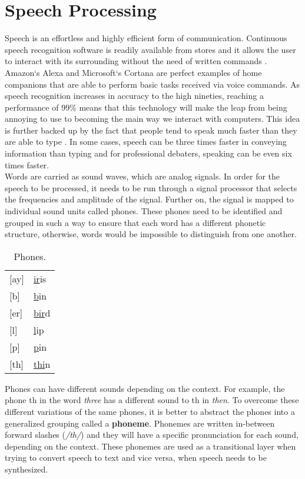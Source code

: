 \chapter{Speech Processing}\label{ch:speech_processing}

Speech is an effortless and highly efficient form of communication.
Continuous speech recognition software is readily available from stores and it allows the user to interact with its surrounding without the need of written commands
\cite[p.~396]{callan2003artificial}. Amazon`s Alexa 
\cite{Alexa} and Microsoft`s Cortana 
\cite{Cortana} are perfect examples of home companions that are able to perform basic tasks received via voice commands.
As speech recognition increases in accuracy to the high nineties, reaching a performance of 99\% means that this technology will make the leap from being annoying to use to becoming the main way we interact with computers. 
This idea is further backed up by the fact that people tend to speak much faster than they are able to type \cite{Speed}.
In some cases, speech can be three times faster in conveying information than typing and for professional debaters,
speaking can be even six times faster. \\

Words are carried as sound waves, which are analog signals.
In order for the speech to be processed,
it needs to be run through a signal processor that selects the frequencies and amplitude of the signal.
Further on, the signal is mapped to individual sound units called phones.
These phones need to be identified and grouped in such a way to ensure that each word has a different phonetic structure,
otherwise, words would be impossible to distinguish from one another. \\

\begin{table}[H]
\centering
	\caption{Phones.}
	\label{my-label}
	\begin{tabular}{l l}
		{[}ay{]} & \underline{ir}is \\
		{[}b{]}  & \underline{b}in  \\
		{[}er{]} & \underline{bir}d \\
		{[}l{]}  & \underline{l}ip  \\
		{[}p{]}  & \underline{p}in  \\
		{[}th{]} & \underline{thi}n
	\end{tabular}
\end{table}

Phones can have different sounds depending on the context. 
For example, the phone th in the word \textit{three} has a different sound to th in \textit{then}. 
To overcome these different variations of the same phones, 
it is better to abstract the phones into a generalized grouping called a \textbf{phoneme}.
Phonemes are written in-between forward slashes
(\textit{/th/}) and they will have a specific pronunciation for each sound, depending on the context.
These phonemes are used as a transitional layer when trying to convert speech to text and vice versa,
when speech needs to be synthesized.

